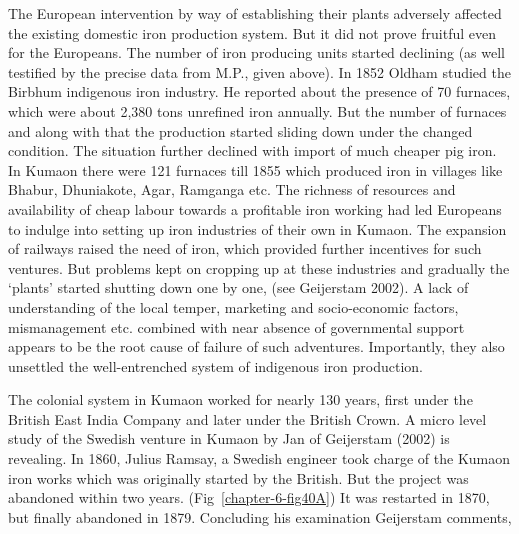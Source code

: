 The European intervention by way of establishing their plants adversely affected the existing domestic iron production system. But it did not prove fruitful even for the Europeans. The number of iron producing units started declining (as well testified by the precise data from M.P., given above).  In 1852 Oldham studied the Birbhum indigenous iron industry. He reported about the presence of 70 furnaces, which were about 2,380 tons unrefined iron annually.  But the number of furnaces and along with that the production started sliding down under the changed condition. The situation further declined with import of much cheaper pig iron. In Kumaon there were 121 furnaces till 1855 which produced iron in villages like Bhabur, Dhuniakote, Agar, Ramganga etc. The richness of resources and availability of cheap labour towards a profitable iron working had led Europeans to indulge into setting up iron industries of their own in Kumaon. The expansion of railways raised the need of iron, which provided further incentives for such ventures. But problems kept on cropping up at these industries and gradually the `plants' started shutting down one by one, (see Geijerstam 2002). A lack of understanding of the local temper, marketing and socio-economic factors, mismanagement etc. combined with near absence of governmental support appears to be the root cause of failure of such adventures. Importantly, they also unsettled the well-entrenched system of indigenous iron production. 

The colonial system in Kumaon worked for nearly 130 years, first under the British East India Company and later under the British Crown. A micro level study of the Swedish venture in Kumaon by Jan of Geijerstam (2002) is revealing. In 1860, Julius Ramsay, a Swedish engineer took charge of the Kumaon iron works which was originally started by the British. But the project was abandoned within two years. (Fig~\ref{chapter-6-fig40A}) It was restarted in 1870, but finally abandoned in 1879. Concluding his examination Geijerstam comments, 

